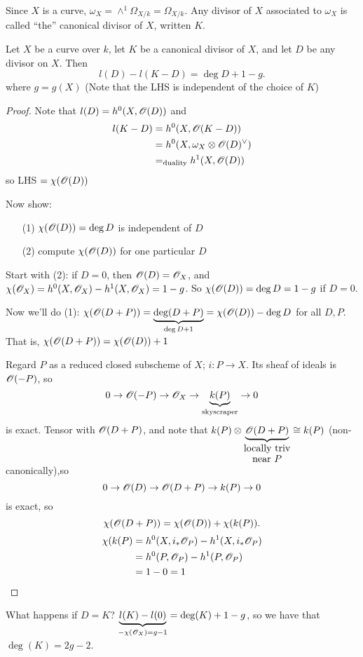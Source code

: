  Since $X$ is a curve, $\omega_X=\wedge^1 \Omega_{X/k} =
 \Omega_{X/k}$.  Any divisor of $X$ associated to $\omega_X$ is
 called ``the'' canonical divisor of $X$, written $K$.

 \begin{theorem}
 Let $X$ be a curve over $k$, let $K$ be a canonical divisor of
 $X$, and let $D$ be any divisor on $X$.  Then
 \[
    l(D)-l(K-D) = \deg D +1-g.
 \]
 where $g=g(X)$ (Note that the LHS is  independent of the choice
 of $K$)
 \end{theorem}
 \begin{proof}
 Note that $l(D)=h^0(X,\mathscr{O}(D))$ and
 \begin{align*}
 l(K-D)&=h^0(X,\mathscr{O}(K-D))\\
 &=h^0(X,\omega_X\otimes \mathscr{O}(D)^{\vee})\\
 &=_{\text{duality}} h^1(X,\mathscr{O}(D))
 \end{align*}
 so LHS $= \chi (\mathscr{O}(D))$

 Now show:
 \begin{itemize}
 \item[(1)] $\chi(\mathscr{O}(D))=\deg D$ is independent of $D$
 \item[(2)] compute $\chi(\mathscr{O}(D))$ for one particular $D$
 \end{itemize}
 Start with (2): if $D=0$, then $\mathscr{O}(D)=\mathscr{O}_X$, and
 $\chi(\mathscr{O}_X)=h^0(X ,\mathscr{O}_X)-h^1(X,\mathscr{O}_X)=1-g$. So $\chi(\mathscr{O}(D))=\deg D
 = 1-g$ if $D=0$.

 Now we'll do (1): $\chi(\mathscr{O}(D+P))=\underbrace{\deg(D+P)}_{\deg
 D+1} = \chi(\mathscr{O}(D)) - \deg D$ for all $D,P$.  That is,
 $\chi(\mathscr{O}(D+P))=\chi(\mathscr{O}(D))+1$

 Regard $P$ as a reduced closed subscheme of $X$; $i:P\to X$.  Its
 sheaf of ideals is $\mathscr{O}(-P)$, so
 \[
    0\to \mathscr{O}(-P) \to \mathscr{O}_X \to \underbrace{k(P)}_{\text{skyscraper}} \to 0
 \]
 is exact.  Tensor with $\mathscr{O}(D+P)$, and note that $k(P)\otimes
 \underbrace{\O(D+P)}_{\txt{locally triv\\ near $P$}}\cong k(P)$
 (non-canonically),so
 \[
    0\to \mathscr{O}(D) \to \mathscr{O}(D+P) \to k(P) \to 0
 \]
 is exact, so
 \[
    \chi(\mathscr{O}(D+P)) = \chi(\mathscr{O}(D))+\chi(k(P)).
 \]
 \begin{align*}
 \chi(k(P) &= h^0(X,i_*\mathscr{O}_P) - h^1(X,i_*\mathscr{O}_P)\\
 &= h^0(P,\mathscr{O}_P)-h^1(P,\mathscr{O}_P)\\
 &= 1-0 = 1
 \end{align*}
 \end{proof}

 What happens if $D=K$?  $\underbrace{l(K)-l(0)}_{-\chi(\mathscr{O}_X)=g-1}=\deg(K)+1-g$,
 so we have that $\deg(K)=2g-2$.

